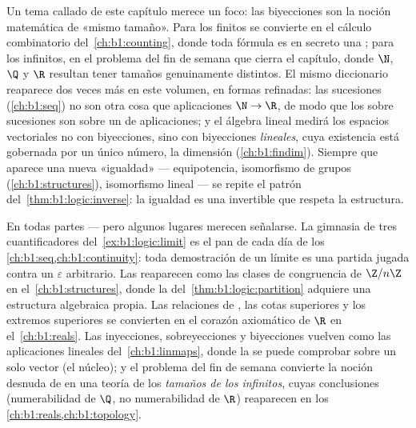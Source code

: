 \begin{remark}\label{rem:b1:logic:interlude}
Un tema callado de este capítulo merece un foco: las biyecciones son la
noción matemática de «mismo tamaño». Para los  finitos se
convierte en el cálculo combinatorio del~\cref{ch:b1:counting}, donde
toda fórmula es en secreto una ; para los  infinitos,
en el problema del fin de semana que cierra el capítulo, donde $\N$,
$\Q$ y $\R$ resultan tener tamaños genuinamente distintos. El mismo
diccionario reaparece dos veces más en este volumen, en formas
refinadas: las sucesiones (\cref{ch:b1:seq}) no son otra cosa que
aplicaciones $\N \to \R$, de modo que los  sobre
sucesiones son  sobre un  de aplicaciones; y el
álgebra lineal medirá los espacios vectoriales no con biyecciones, sino
con biyecciones \emph{lineales}, cuya existencia está gobernada por un
único número, la dimensión (\cref{ch:b1:findim}). Siempre que aparece
una nueva «igualdad» --- equipotencia, isomorfismo de grupos
(\cref{ch:b1:structures}), isomorfismo lineal --- se repite el patrón
del~\cref{thm:b1:logic:inverse}: la igualdad es una 
invertible que respeta la estructura.
\end{remark}

\begin{remark}\label{rem:b1:logic:whereused}
En todas partes --- pero algunos lugares merecen señalarse. La gimnasia
de tres cuantificadores del~\cref{ex:b1:logic:limit} es el pan de cada
día de los \cref{ch:b1:seq,ch:b1:continuity}: toda demostración de un
límite es una partida jugada contra un $\varepsilon$ arbitrario. Las
 reaparecen como las clases de congruencia de
$\Z/n\Z$ en el~\cref{ch:b1:structures}, donde la 
del~\cref{thm:b1:logic:partition} adquiere una estructura algebraica
propia. Las relaciones de , las cotas superiores y los extremos
superiores se convierten en el corazón axiomático de $\R$ en
el~\cref{ch:b1:reals}. Las inyecciones, sobreyecciones y biyecciones
vuelven como las aplicaciones lineales del~\cref{ch:b1:linmaps}, donde
la  se puede comprobar sobre un solo vector (el núcleo); y
el problema del fin de semana convierte la noción desnuda de 
en una teoría de los \emph{tamaños de los  infinitos}, cuyas
conclusiones (numerabilidad de $\Q$, no numerabilidad de $\R$)
reaparecen en los \cref{ch:b1:reals,ch:b1:topology}.
\end{remark}

